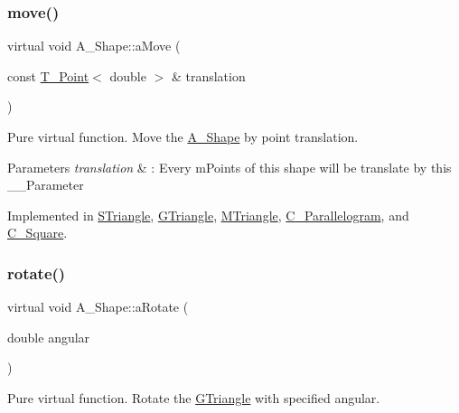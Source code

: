 \mbox{\label{classShape_a1f447acd6219cb10b9b7a40371519c46}} 
\subsubsection{\texorpdfstring{move()}{move()}}
{\footnotesize\ttfamily virtual void A_Shape\+::aMove (\begin{DoxyParamCaption}\item[{const \hyperlink{classPoint}{T_Point}$<$ double $>$ \&}]{translation }\end{DoxyParamCaption})\hspace{0.3cm}{\ttfamily [pure virtual]}}



Pure virtual function. Move the \hyperlink{classShape}{A_Shape} by point translation.


\begin{DoxyParams}{Parameters}
{\em translation} & \+: Every mPoints of this shape will be translate by this __Parameter \\
\hline
\end{DoxyParams}


Implemented in \hyperlink{classSTriangle_ac72888032cde56407193da9435e2fcc0}{S\+Triangle}, \hyperlink{classGTriangle_a6675f3448fca16c1afec576145a9b139}{G\+Triangle}, \hyperlink{classMTriangle_aa21f0514a8af2beba5ecf2ea5a22a4ef}{M\+Triangle}, \hyperlink{classParallelogram_ae8d51f9b629160df31c8a12c28da279e}{C_Parallelogram}, and \hyperlink{classSquare_a75b2fd22fc3895b83bc20728afb20b10}{C_Square}.

\mbox{\label{classShape_a2dea8616fd40f2d69fd208715921982a}} 
\subsubsection{\texorpdfstring{rotate()}{Rotate()}}
{\footnotesize\ttfamily virtual void A_Shape\+::aRotate (\begin{DoxyParamCaption}\item[{double}]{angular }\end{DoxyParamCaption})\hspace{0.3cm}{\ttfamily [pure virtual]}}



Pure virtual function. Rotate the \hyperlink{classGTriangle}{G\+Triangle} with specified angular.


